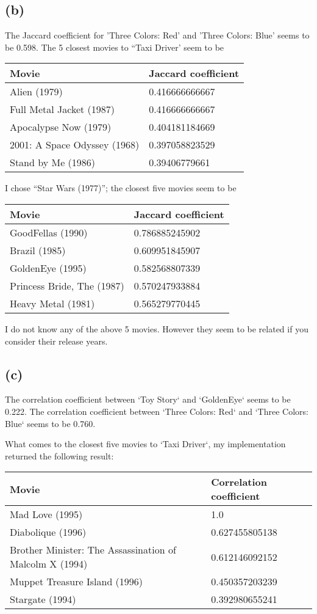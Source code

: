 \documentclass[10pt]{article}
\begin{document}
\subsection*{(b)} The Jaccard coefficient for 'Three Colors: Red' and 'Three Colors: Blue' seems to be 0.598.
The 5 closest movies to ``Taxi Driver' seem to be 
\begin{center}
\begin{tabular}{|l|l|}
\hline
Movie & Jaccard coefficient \\
\hline
Alien (1979) & 0.416666666667 \\
Full Metal Jacket (1987) & 0.416666666667 \\
Apocalypse Now (1979) & 0.404181184669 \\
2001: A Space Odyssey (1968) &  0.397058823529 \\
Stand by Me (1986) &  0.39406779661 \\
\hline
\end{tabular}
\end{center}

I chose ``Star Wars (1977)''; the closest five movies seem to be
\begin{center}
\begin{tabular}{|l|l|}
\hline 
Movie & Jaccard coefficient \\
\hline
GoodFellas (1990) 			  & 0.786885245902 \\
Brazil (1985)         			  & 0.609951845907 \\
GoldenEye (1995)              & 0.582568807339 \\
Princess Bride, The (1987) & 0.570247933884 \\
Heavy Metal (1981) 			  & 0.565279770445 \\
\hline
\end{tabular}
\end{center}
I do not know any of the above 5 movies. However they seem to be related if you consider their release years.

\subsection*{(c)}
The correlation coefficient between `Toy Story` and `GoldenEye` seems to be 0.222. The correlation coefficient between `Three Colors: Red` and `Three Colors: Blue` seems to be 0.760.

What comes to the closest five movies to `Taxi Driver`, my implementation returned the following result:
\begin{center}
\begin{tabular}{|l|l|}
\hline 
Movie & Correlation coefficient \\
\hline
Mad Love (1995) & 1.0 \\
Diabolique (1996) & 0.627455805138 \\
Brother Minister: The Assassination of Malcolm X (1994) & 0.612146092152 \\
Muppet Treasure Island (1996) & 0.450357203239 \\
Stargate (1994) & 0.392980655241 \\
\hline
\end{tabular}
\end{center}
\end{document}
